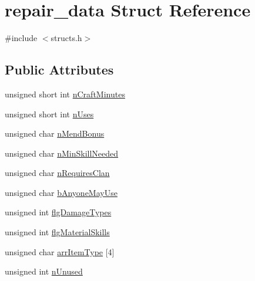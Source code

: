 \hypertarget{structrepair__data}{\section{repair\-\_\-data Struct Reference}
\label{structrepair__data}
}


{\ttfamily \#include $<$structs.\-h$>$}

\subsection*{Public Attributes}
\begin{DoxyCompactItemize}
\item 
unsigned short int \hyperlink{structrepair__data_aaf9cb30501da0fcdd9ec2d3a7f046163}{n\-Craft\-Minutes}
\item 
unsigned short int \hyperlink{structrepair__data_aeb708e14f1dc18f87b9ad3d8d76af2b1}{n\-Uses}
\item 
unsigned char \hyperlink{structrepair__data_a27d05ca35c7f078dbf88614de0c61b23}{n\-Mend\-Bonus}
\item 
unsigned char \hyperlink{structrepair__data_ad636f0948e248bda6414c21ae873f7f6}{n\-Min\-Skill\-Needed}
\item 
unsigned char \hyperlink{structrepair__data_ad0cbc9f8bb473c514fc096d350fce8cd}{n\-Requires\-Clan}
\item 
unsigned char \hyperlink{structrepair__data_a6653d42ba1113629231aa0866039a8c1}{b\-Anyone\-May\-Use}
\item 
unsigned int \hyperlink{structrepair__data_a848d9f9734398c80549f983f6ed1f12e}{flg\-Damage\-Types}
\item 
unsigned int \hyperlink{structrepair__data_ac2c69e734cf15c23f0596e1163cf9147}{flg\-Material\-Skills}
\item 
unsigned char \hyperlink{structrepair__data_a0606072cc6581b1d5ca402204c436f88}{arr\-Item\-Type} \mbox{[}4\mbox{]}
\item 
unsigned int \hyperlink{structrepair__data_a4529eaf745909e45171be3ba70399528}{n\-Unused}
\end{DoxyCompactItemize}


